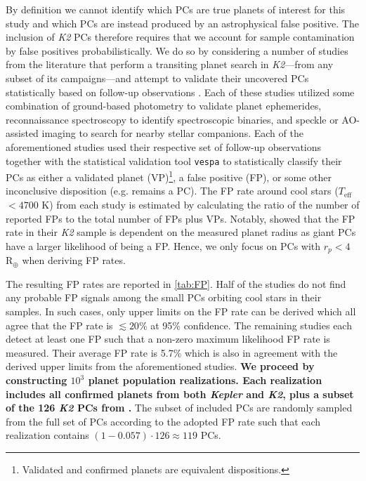 \documentclass[twocolumn]{emulateapj}
\newcommand{\kepler}[1]{\emph{Kepler}#1}
\newcommand{\ktwo}[1]{\emph{K2}#1}
\newcommand{\teff}[1]{$T_{\text{eff}}$#1}
\begin{document}
By definition we cannot identify which PCs are true planets of interest for this study and
which PCs are instead produced by an astrophysical false positive. 
The inclusion of \ktwo{} PCs therefore requires that we account for sample contamination by false positives
probabilistically. We do so by considering
a number of studies from the literature that perform a transiting planet search in \ktwo{---}from any subset of its
campaigns---and attempt to validate their uncovered PCs statistically based on follow-up observations
\citep{montet15,crossfield16b,dressing17,hirano18,livingston18a,mayo18}. Each of these studies utilized some combination of
ground-based photometry to validate planet ephemerides, reconnaissance
spectroscopy to identify spectroscopic binaries, and speckle or AO-assisted imaging to search for nearby stellar companions.
Each of the aforementioned studies used their respective set of follow-up observations together with the
statistical validation tool \texttt{vespa} \citep{morton12,morton15} to statistically classify their PCs as either a validated
planet (VP)\footnote{Validated and confirmed planets are equivalent dispositions.},
a false positive (FP), or some other inconclusive disposition (e.g. remains a PC). The FP rate around cool
stars (\teff{} $< 4700$ K) from each study is estimated by calculating the ratio of the number of reported FPs to
the total number of FPs plus VPs. Notably, \cite{crossfield16b} showed that the FP rate in their \ktwo{} sample is dependent
on the measured planet radius as giant PCs have a larger likelihood of
being a FP. Hence, we only focus on PCs with $r_p<4$ R$_{\oplus}$ when deriving FP rates.

The resulting FP rates are reported in \autoref{tab:FP}. Half of the studies do not find any probable
FP signals among the small PCs orbiting cool stars in their samples. In such cases, only upper limits on the FP rate
can be derived which all agree that the FP rate is $\lesssim 20$\% at 95\% confidence. The remaining studies
each detect at least one FP such that a non-zero maximum likelihood FP rate is measured. Their average FP rate is 5.7\%
which is also in agreement with the derived upper limits from the aforementioned studies.
\textbf{We proceed by constructing $10^3$ planet population realizations. Each realization
  includes all confirmed planets from both \kepler{} and \ktwo{,} plus a subset of the 126 \ktwo{} PCs from
\cite{kruse19}.} The subset of included PCs are randomly sampled from the full set of PCs
according to the adopted FP rate such that each realization contains $(1-0.057)\cdot 126 \approx 119$ PCs.
\end{document}
